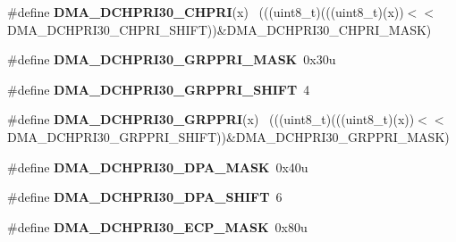 \begin{DoxyCompactItemize}
\item 
\hypertarget{group___d_m_a___register___masks_ga0d02f2e2a636647d0b0c5416116604b8}{}\#define {\bfseries D\+M\+A\+\_\+\+D\+C\+H\+P\+R\+I30\+\_\+\+C\+H\+P\+R\+I}(x)                                    ~(((uint8\+\_\+t)(((uint8\+\_\+t)(x))$<$$<$D\+M\+A\+\_\+\+D\+C\+H\+P\+R\+I30\+\_\+\+C\+H\+P\+R\+I\+\_\+\+S\+H\+I\+F\+T))\&D\+M\+A\+\_\+\+D\+C\+H\+P\+R\+I30\+\_\+\+C\+H\+P\+R\+I\+\_\+\+M\+A\+S\+K)\label{group___d_m_a___register___masks_ga0d02f2e2a636647d0b0c5416116604b8}

\item 
\hypertarget{group___d_m_a___register___masks_ga129372e4053542710c19bbef02f499e7}{}\#define {\bfseries D\+M\+A\+\_\+\+D\+C\+H\+P\+R\+I30\+\_\+\+G\+R\+P\+P\+R\+I\+\_\+\+M\+A\+S\+K}~0x30u\label{group___d_m_a___register___masks_ga129372e4053542710c19bbef02f499e7}

\item 
\hypertarget{group___d_m_a___register___masks_gac833ab4f37fd71da8c7f046d6e2b6520}{}\#define {\bfseries D\+M\+A\+\_\+\+D\+C\+H\+P\+R\+I30\+\_\+\+G\+R\+P\+P\+R\+I\+\_\+\+S\+H\+I\+F\+T}~4\label{group___d_m_a___register___masks_gac833ab4f37fd71da8c7f046d6e2b6520}

\item 
\hypertarget{group___d_m_a___register___masks_gac00e95295edf8bf2cbc352c8f7e60353}{}\#define {\bfseries D\+M\+A\+\_\+\+D\+C\+H\+P\+R\+I30\+\_\+\+G\+R\+P\+P\+R\+I}(x)                                  ~(((uint8\+\_\+t)(((uint8\+\_\+t)(x))$<$$<$D\+M\+A\+\_\+\+D\+C\+H\+P\+R\+I30\+\_\+\+G\+R\+P\+P\+R\+I\+\_\+\+S\+H\+I\+F\+T))\&D\+M\+A\+\_\+\+D\+C\+H\+P\+R\+I30\+\_\+\+G\+R\+P\+P\+R\+I\+\_\+\+M\+A\+S\+K)\label{group___d_m_a___register___masks_gac00e95295edf8bf2cbc352c8f7e60353}

\item 
\hypertarget{group___d_m_a___register___masks_gac4d058657f56eb73f7fe1a9e299ad094}{}\#define {\bfseries D\+M\+A\+\_\+\+D\+C\+H\+P\+R\+I30\+\_\+\+D\+P\+A\+\_\+\+M\+A\+S\+K}~0x40u\label{group___d_m_a___register___masks_gac4d058657f56eb73f7fe1a9e299ad094}

\item 
\hypertarget{group___d_m_a___register___masks_ga4cb41f7e419512eee9f5788c18dd059e}{}\#define {\bfseries D\+M\+A\+\_\+\+D\+C\+H\+P\+R\+I30\+\_\+\+D\+P\+A\+\_\+\+S\+H\+I\+F\+T}~6\label{group___d_m_a___register___masks_ga4cb41f7e419512eee9f5788c18dd059e}

\item 
\hypertarget{group___d_m_a___register___masks_gabe16663555ce592570a938132b828878}{}\#define {\bfseries D\+M\+A\+\_\+\+D\+C\+H\+P\+R\+I30\+\_\+\+E\+C\+P\+\_\+\+M\+A\+S\+K}~0x80u\label{group___d_m_a___register___masks_gabe16663555ce592570a938132b828878}


\end{DoxyCompactItemize}
